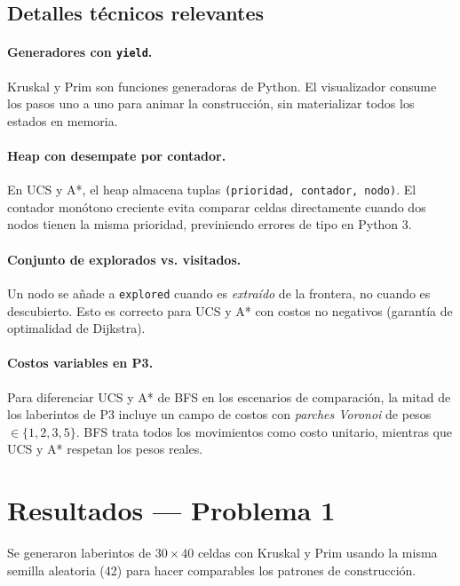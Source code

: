 \documentclass[12pt,a4paper]{article}
\begin{document}
\subsection{Detalles técnicos relevantes}

\paragraph{Generadores con \texttt{yield}.}
Kruskal y Prim son funciones generadoras de Python. El visualizador
consume los pasos uno a uno para animar la construcción, sin
materializar todos los estados en memoria.

\paragraph{Heap con desempate por contador.}
En UCS y A*, el heap almacena tuplas \texttt{(prioridad, contador, nodo)}.
El contador monótono creciente evita comparar celdas directamente
cuando dos nodos tienen la misma prioridad, previniendo errores de
tipo en Python 3.

\paragraph{Conjunto de explorados vs. visitados.}
Un nodo se añade a \texttt{explored} cuando es \emph{extraído} de la
frontera, no cuando es descubierto. Esto es correcto para UCS y A* con
costos no negativos (garantía de optimalidad de Dijkstra).

\paragraph{Costos variables en P3.}
Para diferenciar UCS y A* de BFS en los escenarios de comparación,
la mitad de los laberintos de P3 incluye un campo de costos con
\emph{parches Voronoi} de pesos $\in\{1, 2, 3, 5\}$. BFS trata
todos los movimientos como costo unitario, mientras que UCS y A*
respetan los pesos reales.

\section{Resultados --- Problema 1}

Se generaron laberintos de $30\times40$ celdas con Kruskal y Prim
usando la misma semilla aleatoria (42) para hacer comparables los
patrones de construcción.
\end{document}
